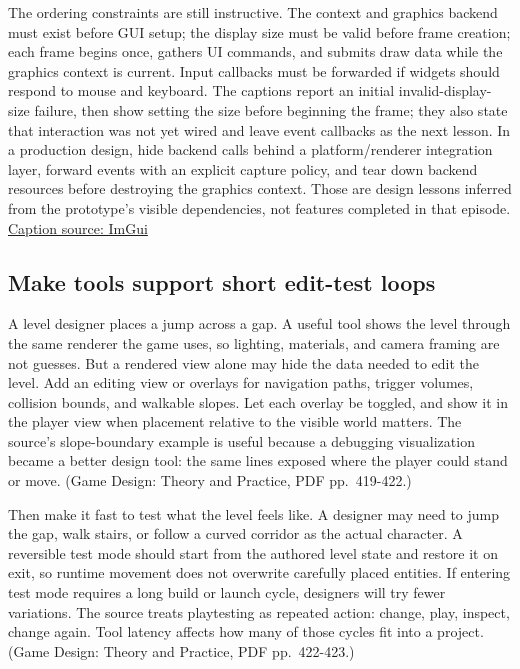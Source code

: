 The ordering constraints are still instructive. The context and graphics backend must exist before GUI setup; the display size must be valid before frame creation; each frame begins once, gathers UI commands, and submits draw data while the graphics context is current. Input callbacks must be forwarded if widgets should respond to mouse and keyboard. The captions report an initial invalid-display-size failure, then show setting the size before beginning the frame; they also state that interaction was not yet wired and leave event callbacks as the next lesson. In a production design, hide backend calls behind a platform/renderer integration layer, forward events with an explicit capture policy, and tear down backend resources before destroying the graphics context. Those are design lessons inferred from the prototype's visible dependencies, not features completed in that episode. \href{https://www.youtube.com/watch?v=st4lgNI6_F4}{Caption source: ImGui}

\subsection{Make tools support short edit-test loops}\label{06-engine-ii-ch032-make-tools-support-short-edit-test-loops}

A level designer places a jump across a gap. A useful tool shows the level through the same renderer the game uses, so lighting, materials, and camera framing are not guesses. But a rendered view alone may hide the data needed to edit the level. Add an editing view or overlays for navigation paths, trigger volumes, collision bounds, and walkable slopes. Let each overlay be toggled, and show it in the player view when placement relative to the visible world matters. The source's slope-boundary example is useful because a debugging visualization became a better design tool: the same lines exposed where the player could stand or move. (Game Design: Theory and Practice, PDF pp.~419-422.)

Then make it fast to test what the level feels like. A designer may need to jump the gap, walk stairs, or follow a curved corridor as the actual character. A reversible test mode should start from the authored level state and restore it on exit, so runtime movement does not overwrite carefully placed entities. If entering test mode requires a long build or launch cycle, designers will try fewer variations. The source treats playtesting as repeated action: change, play, inspect, change again. Tool latency affects how many of those cycles fit into a project. (Game Design: Theory and Practice, PDF pp.~422-423.)

